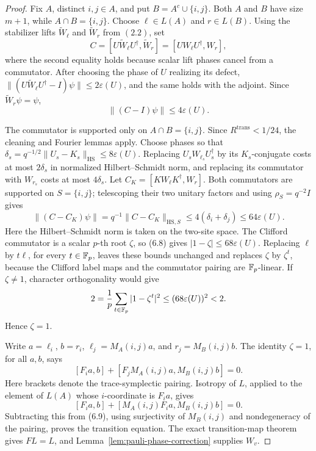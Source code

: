 \begin{proof}
Fix \(A\), distinct \(i,j\in A\), and put
\(B=A^c\cup\{i,j\}\).  Both \(A\) and \(B\) have size \(m+1\), while
\(A\cap B=\{i,j\}\).  Choose \(\ell\in L(A)\) and \(r\in L(B)\).
Using the stabilizer lifts \(\widetilde W_\ell\) and
\(\widetilde W_r\) from \((2.2)\), set
\[
 C=[U\widetilde W_\ell U^\dagger,\widetilde W_r]
  =[UW_\ell U^\dagger,W_r],
\]
where the second equality holds because scalar lift phases cancel from a
commutator.
After choosing the phase of \(U\) realizing its defect,
\(\lVert(U\widetilde W_\ell U^\dagger-I)\psi\rVert
\leq2\varepsilon(U)\), and the same holds with the adjoint.  Since
\(\widetilde W_r\psi=\psi\),
\[
 \lVert(C-I)\psi\rVert\leq4\varepsilon(U).             \tag{6.8}
\]

The commutator is supported only on \(A\cap B=\{i,j\}\).
Since \(R^{\mathrm{trans}}<1/24\), the cleaning and Fourier lemmas apply.
Choose phases so that
\(\delta_s=q^{-1/2}\lVert U_s-K_s\rVert_{\mathrm{HS}}
\leq8\varepsilon(U)\).
Replacing \(U_sW_{\ell_s}U_s^\dagger\) by its \(K_s\)-conjugate costs at
most \(2\delta_s\) in normalized Hilbert--Schmidt norm, and replacing its
commutator with \(W_{r_s}\) costs at most \(4\delta_s\).
Let \(C_K=[KW_\ell K^\dagger,W_r]\).  Both commutators are supported on
\(S=\{i,j\}\); telescoping their two unitary factors and using
\(\rho_S=q^{-2}I\) gives
\[
 \lVert(C-C_K)\psi\rVert
 =q^{-1}\lVert C-C_K\rVert_{\mathrm{HS},S}
 \leq4(\delta_i+\delta_j)\leq64\varepsilon(U).
\]
Here the Hilbert--Schmidt norm is taken on the two-site space.
The Clifford commutator is a scalar \(p\)-th root \(\zeta\), so (6.8)
gives \(|1-\zeta|\leq68\varepsilon(U)\).
Replacing \(\ell\) by \(t\ell\), for every \(t\in\mathbb F_p\), leaves these
bounds unchanged and replaces \(\zeta\) by \(\zeta^t\), because the
Clifford label maps and the commutator pairing are \(\mathbb F_p\)-linear.
If \(\zeta\ne1\), character orthogonality would give
\[
 2=\frac1p\sum_{t\in\mathbb F_p}|1-\zeta^t|^2
 \leq(68\varepsilon(U))^2<2.
\]
Hence \(\zeta=1\).

Write \(a=\ell_i\), \(b=r_i\),
\(\ell_j=M_A(i,j)a\), and \(r_j=M_B(i,j)b\).
The identity \(\zeta=1\), for all \(a,b\), says
\[
 [F_i a,b]+[F_jM_A(i,j)a,M_B(i,j)b]=0.                \tag{6.9}
\]
Here brackets denote the trace-symplectic pairing.  Isotropy of \(L\),
applied to the element of \(L(A)\) whose \(i\)-coordinate is \(F_i a\),
gives
\[
 [F_i a,b]+[M_A(i,j)F_i a,M_B(i,j)b]=0.
\]
Subtracting this from (6.9), using surjectivity of \(M_B(i,j)\) and
nondegeneracy of the pairing, proves the transition equation.
The exact transition-map theorem gives \(FL=L\), and
Lemma~\ref{lem:pauli-phase-correction} supplies \(W_v\).
\end{proof}


